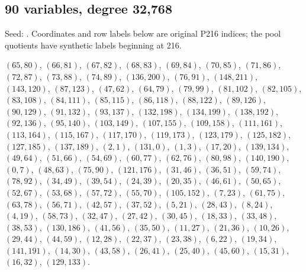 \subsection*{90 variables, degree 32,768}
Seed: . Coordinates and row labels below are original P216 indices; the pool quotients have synthetic labels beginning at 216.
{\small\raggedright
$(65,80)$, $(66,81)$, $(67,82)$, $(68,83)$, $(69,84)$, $(70,85)$, $(71,86)$, $(72,87)$, $(73,88)$, $(74,89)$, $(136,200)$, $(76,91)$, $(148,211)$, $(143,120)$, $(87,123)$, $(47,62)$, $(64,79)$, $(79,99)$, $(81,102)$, $(82,105)$, $(83,108)$, $(84,111)$, $(85,115)$, $(86,118)$, $(88,122)$, $(89,126)$, $(90,129)$, $(91,132)$, $(93,137)$, $(132,198)$, $(134,199)$, $(138,192)$, $(92,136)$, $(95,140)$, $(103,149)$, $(107,155)$, $(109,158)$, $(111,161)$, $(113,164)$, $(115,167)$, $(117,170)$, $(119,173)$, $(123,179)$, $(125,182)$, $(127,185)$, $(137,189)$, $(2,1)$, $(131,0)$, $(1,3)$, $(17,20)$, $(139,134)$, $(49,64)$, $(51,66)$, $(54,69)$, $(60,77)$, $(62,76)$, $(80,98)$, $(140,190)$, $(0,7)$, $(48,63)$, $(75,90)$, $(121,176)$, $(31,46)$, $(36,51)$, $(59,74)$, $(78,92)$, $(34,49)$, $(39,54)$, $(24,39)$, $(20,35)$, $(46,61)$, $(50,65)$, $(52,67)$, $(53,68)$, $(57,72)$, $(55,70)$, $(105,152)$, $(7,23)$, $(61,75)$, $(63,78)$, $(56,71)$, $(42,57)$, $(37,52)$, $(5,21)$, $(28,43)$, $(8,24)$, $(4,19)$, $(58,73)$, $(32,47)$, $(27,42)$, $(30,45)$, $(18,33)$, $(33,48)$, $(38,53)$, $(130,186)$, $(41,56)$, $(35,50)$, $(11,27)$, $(21,36)$, $(10,26)$, $(29,44)$, $(44,59)$, $(12,28)$, $(22,37)$, $(23,38)$, $(6,22)$, $(19,34)$, $(141,191)$, $(14,30)$, $(43,58)$, $(26,41)$, $(25,40)$, $(45,60)$, $(15,31)$, $(16,32)$, $(129,133)$.\par}

